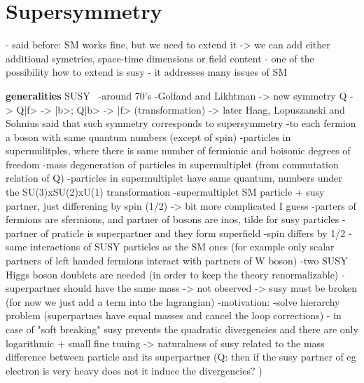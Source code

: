 




\section{Supersymmetry}

- said before: SM works fine, but we need to extend it -> we can add either additional symetries, space-time dimensions or field content
- one of the possibility how to extend is susy 
- it addresses many issues of SM

\textbf{generalities}
SUSY~\cite{Martin:1997ns}
-around 70's
-Golfand and Likhtman -> new symmetry Q -> Q|f> -> |b>; Q|b> -> |f> (transformation) -> later Haag, Lopuszanski and Sohnius said that such symmetry corresponds to supersymmetry
-to each fermion a boson  with same quantum numbers (except of spin)
-particles in supermulitples, where there is same number of fermionic and boisonic degrees of freedom
-mass degeneration of particles in supermultiplet (from commutation relation of Q)
-particles in supermultiplet have same quantum, numbers under the SU(3)xSU(2)xU(1) transformation
-supermultiplet SM particle + susy partner, just differening by spin (1/2) -> bit more complicated I guess
-parters of fermions are sfermions, and partner of bosons are inos, tilde for susy particles
-partner of praticle is superpartner and they form superfield
-spin differs by 1/2
-same interactions of SUSY particles as the SM ones (for example only scalar partners of left handed fermions interact with partners of W boson)
-two SUSY Higgs boson doublets are needed (in order to keep the theory renormalizable)
-superpartner should have the same mass -> not observed -> susy must be broken (for now we just add a term into the lagrangian)
-motivation:
	-solve hierarchy problem (superpartnes have equal masses and cancel the loop corrections) - in case of "soft breaking" susy prevents the quadratic divergencies and there are only logarithmic + small fine tuning
	-> naturalness of susy related to the mass difference between particle and its superpartner (Q: then if the susy partner of eg electron is very heavy does not it induce the divergencies? )

